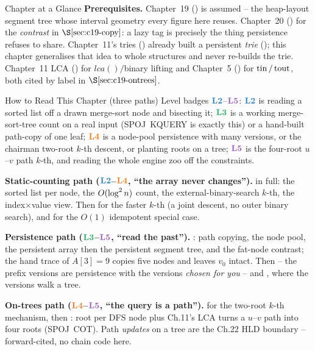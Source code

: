 \begin{chaptertheorybox}{Chapter at a Glance}
\textbf{Prerequisites.} Chapter~19 () is assumed -- the heap-layout
segment tree whose interval geometry every figure here reuses.  Chapter~20
() for the \emph{contrast} in \(\secref{c19-copy}\): a lazy tag is
precisely the thing persistence refuses to share.  Chapter~11's tries
() already built a persistent \emph{trie} ();
this chapter generalises that idea to whole structures and never re-builds the
trie.  Chapter~11 LCA () for \(\mathit{lca}()/\)binary lifting and
Chapter~5 () for \(\operatorname{tin}/\operatorname{tout}\), both cited by label in
\(\secref{c19-ontrees}\).
\end{chaptertheorybox}

\begin{chaptertheorybox}{How to Read This Chapter (three paths)}
Level badges \(\lv2\)--\(\lv5\): \(\lv2\) is reading a sorted list off a drawn
merge-sort node and bisecting it; \(\lv3\) is a working merge-sort-tree count
on a real input (SPOJ~KQUERY is exactly this) or a hand-built path-copy of one
leaf; \(\lv4\) is a node-pool persistence with many versions, or the chairman
two-root \(k\)-th descent, or planting roots on a tree; \(\lv5\) is the four-root
\(u\)--\(v\) path \(k\)-th, and reading the whole engine zoo off the
constraints.

\textbf{Static-counting path (\(\lv2\)--\(\lv4\), ``the array never changes'').}
 in full: the sorted list per node, the \(O(\log^2 n)\)
count, the external-binary-search \(k\)-th, the index\(\times\)value view.
Then  for the faster \(k\)-th (a joint descent, no outer
binary search), and  for the \(O(1)\) idempotent special
case.

\textbf{Persistence path (\(\lv3\)--\(\lv5\), ``read the past'').}
: path copying, the node pool, the persistent array then the
persistent segment tree, and the fat-node contrast; the hand trace of \(A[3]=9\)
copies five nodes and leaves \(v_0\) intact.  Then  -- the
prefix versions are persistence with the versions \emph{chosen for you} -- and
, where the versions walk a tree.

\textbf{On-trees path (\(\lv4\)--\(\lv5\), ``the query is a path'').}
 for the two-root \(k\)-th mechanism, then
: root per DFS node plus Ch.11's LCA turns a \(u\)--\(v\)
path into four roots (SPOJ~COT).  Path \emph{updates} on a tree are the Ch.22
HLD boundary -- forward-cited, no chain code here.
\end{chaptertheorybox}

